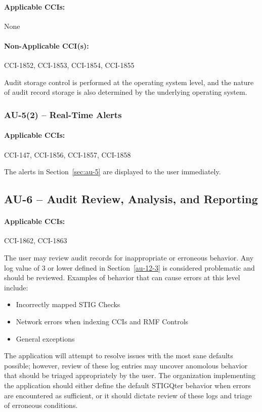 \documentclass[letterpaper, 10pt, twoside]{article}
\begin{document}
\paragraph{Applicable CCIs:} None

\paragraph{Non-Applicable CCI(s):} CCI-1852, CCI-1853, CCI-1854, CCI-1855

Audit storage control is performed at the operating system level, and the nature of audit record storage is also determined by the underlying operating system.

\subsubsection{AU-5(2) -- Real-Time Alerts}

\paragraph{Applicable CCIs:} CCI-147, CCI-1856, CCI-1857, CCI-1858

The alerts in Section~\ref{sec:au-5} are displayed to the user immediately.

\subsection{AU-6 -- Audit Review, Analysis, and Reporting}

\paragraph{Applicable CCIs:} CCI-1862, CCI-1863

The user may review audit records for inappropriate or erroneous behavior. Any log value of 3 or lower defined in Section~\ref{au-12-3} is considered problematic and should be reviewed. Examples of behavior that can cause errors at this level include:
\begin{itemize}
	\item Incorrectly mapped STIG Checks
	\item Network errors when indexing CCIs and RMF Controls
	\item General exceptions
\end{itemize}

The application will attempt to resolve issues with the most sane defaults possible; however, review of these log entries may uncover anomolous behavior that should be triaged appropriately by the user. The organization implementing the application should either define the default STIGQter behavior when errors are encountered as sufficient, or it should dictate review of these logs and triage of erroneous conditions.
\end{document}
